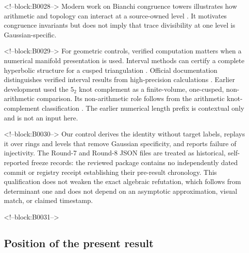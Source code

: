\documentclass[11pt,a4paper]{article}
\theoremstyle{definition}
\theoremstyle{remark}
\begin{document}
<!--block:B0028-->
Modern work on Bianchi congruence towers illustrates how arithmetic and topology can interact at a source-owned level \citep[Introduction and Sec.~2]{PfaffRaimbault2020}. It motivates congruence invariants but does not imply that trace divisibility at one level is Gaussian-specific.

<!--block:B0029-->
For geometric controls, verified computation matters when a numerical manifold presentation is used.
Interval methods can certify a complete hyperbolic structure for a cusped triangulation \citep[Thm.~5.1 and Secs.~3--5]{HIKMOT2016}.
Official documentation distinguishes verified interval results from high-precision calculations \citep[verified computations and \texttt{verify\_hyperbolicity}]{SnapPyDocs2026}.
Earlier development used the \(5_2\) knot complement as a finite-volume, one-cusped, non-arithmetic comparison.
Its non-arithmetic role follows from the arithmetic knot-complement classification \citep[main theorem]{Reid1991}. The earlier numerical length prefix is contextual only and is not an input here.

<!--block:B0030-->
Our control derives the identity without target labels, replays it over rings and levels that remove Gaussian specificity, and reports failure of injectivity. The Round-7 and Round-8 JSON files are treated as historical, self-reported freeze records: the reviewed package contains no independently dated commit or registry receipt establishing their pre-result chronology. This qualification does not weaken the exact algebraic refutation, which follows from determinant one and does not depend on an asymptotic approximation, visual match, or claimed timestamp.

<!--block:B0031-->
\subsection{Position of the present result}
\end{document}
